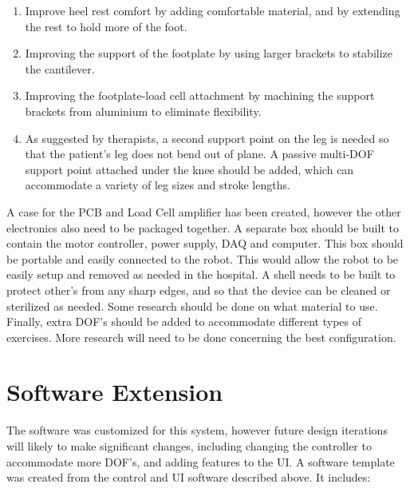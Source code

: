 \documentclass[12pt]{report}
\begin{document}
	\begin{enumerate}
		\item Improve heel rest comfort by adding comfortable material, and by extending the rest to hold more of the foot. 
		\item Improving the support of the footplate by using larger brackets to stabilize the cantilever. 
		\item Improving the footplate-load cell attachment by machining the support brackets from aluminium to eliminate flexibility. 
		\item As suggested by therapists, a second support point on the leg is needed so that the patient's leg does not bend out of plane. A passive multi-DOF support point attached under the knee should be added, which can accommodate a variety of leg sizes and stroke lengths. 
	\end{enumerate}		
	
	A case for the PCB and Load Cell amplifier has been created, however the other electronics also need to be packaged together. A separate box should be built to contain the motor controller, power supply, DAQ and computer. This box should be portable and easily connected to the robot. This would allow the robot to be easily setup and removed as needed in the hospital. A shell needs to be built to protect other's from any sharp edges, and so that the device can be cleaned or sterilized as needed. Some research should be done on what material to use. Finally, extra DOF's should be added to accommodate different types of exercises. More research will need to be done concerning the best configuration. 

		\section{Software Extension}
	
			
	The software was customized for this system, however future design iterations will likely to make significant changes, including changing the controller to accommodate more DOF's, and adding features to the UI. A software template was created from the control and UI software described above. It includes:
	
\end{document}
